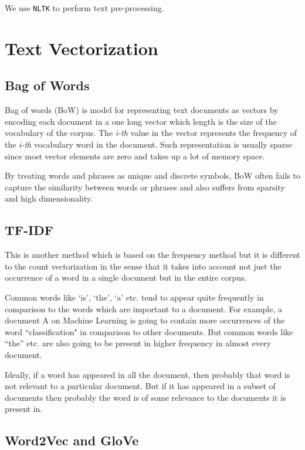 \documentclass{article}
\begin{document}
	We use \texttt{NLTK} to perform text pre-processing.
	
	\section{Text Vectorization}
	
	\subsection{Bag of Words}
	
	Bag of words (BoW) is model for representing text documents as vectors by encoding each document in a one long vector which length is the size of the vocabulary of the corpus. The \textit{i-th} value in the vector represents the frequency of the \textit{i-th} vocabulary word in the document. Such representation is usually sparse since most vector elements are zero and takes up a lot of memory space.
	
	By treating words and phrases as unique and discrete symbols, BoW often fails to capture the similarity between words or phrases and also suffers from sparsity and high dimensionality. \cite{chen2017efficient}
	
	\subsection{TF-IDF}
	
	This is another method which is based on the frequency method but it is different to the count vectorization in the sense that it takes into account not just the occurrence of a word in a single document but in the entire corpus.
	
	Common words like ‘is’, ‘the’, ‘a’ etc. tend to appear quite frequently in comparison to the words which are important to a document. For example, a document A on Machine Learning is going to contain more occurrences of the word “classification" in comparison to other documents. But common words like “the” etc. are also going to be present in higher frequency in almost every document.
	
	Ideally, if a word has appeared in all the document, then probably that word is not relevant to a particular document. But if it has appeared in a subset of documents then probably the word is of some relevance to the documents it is present in.
	
	\subsection{Word2Vec and GloVe}
	
\end{document}
